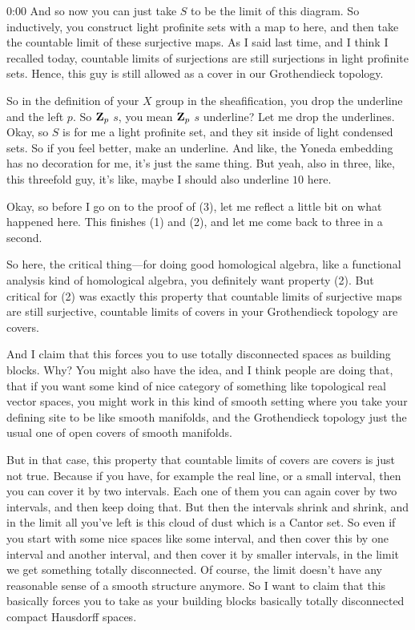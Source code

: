\begin{unfinished}{0:00}
And so now you can just take $S$ to be the limit of this diagram. So inductively, you construct light profinite sets with a map to here, and then take the countable limit of these surjective maps. As I said last time, and I think I recalled today, countable limits of surjections are still surjections in light profinite sets. Hence, this guy is still allowed as a cover in our Grothendieck topology.

So in the definition of your $X$ group in the sheafification, you drop the underline and the left $p$. So $\mathbf Z_p$ $s$, you mean $\mathbf Z_p$ $s$ underline? Let me drop the underlines. Okay, so $S$ is for me a light profinite set, and they sit inside of light condensed sets. So if you feel better, make an underline. 
And like, the Yoneda embedding has no decoration for me, it's just the same thing. But yeah, also in three, like, this threefold guy, it's like, maybe I should also underline $10$ here.

Okay, so before I go on to the proof of (3), let me reflect a little bit on what happened here. This finishes (1) and (2), and let me come back to three in a second.

So here, the critical thing---for doing good homological algebra, like a functional analysis kind of homological algebra, you definitely want property (2). But critical for (2) was exactly this property that countable limits of surjective maps are still surjective, countable limits of covers in your Grothendieck topology are covers.

And I claim that this forces you to use totally disconnected spaces as building blocks. Why? You might also have the idea, and I think people are doing that, that if you want some kind of nice category of something like topological real vector spaces, you might work in this kind of smooth setting where you take your defining site to be like smooth manifolds, and the Grothendieck topology just the usual one of open covers of smooth manifolds.

But in that case, this property that countable limits of covers are covers is just not true. Because if you have, for example the real line, or a small interval, then you can cover it by two intervals. Each one of them you can again cover by two intervals, and then keep doing that. But then the intervals shrink and shrink, and in the limit all you've left is this cloud of dust which is a Cantor set. So even if you start with some nice spaces like some interval, and then cover this by one interval and another interval, and then cover it by smaller intervals, in the limit we get something totally disconnected.
Of course, the limit doesn't have any reasonable sense of a smooth structure anymore. So I want to claim that this basically forces you to take as your building blocks basically totally disconnected compact Hausdorff spaces. 


\end{unfinished}

